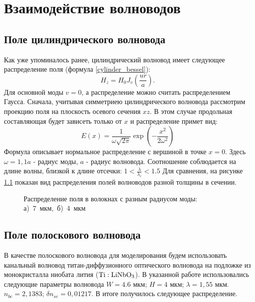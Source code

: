 \chapter{Взаимодействие волноводов}
\label{coupling}
\section{Поле цилиндрического волновода}
Как уже упоминалось ранее, цилиндрический волновод имеет следующее распределение поля (формула \ref{cylinder_bessel}):
$$
	H_z = H_0 J_v (\frac{ur}{a}).
$$
Для основной моды $v = 0$, а распределение можно считать распределением Гаусса. Сначала, учитывая  симметриею цилиндрического волновода рассмотрим проекцию поля на плоскость осевого сечения $xz$. В этом случае продольная составляющая будет зависеть только от $x$ и распределение примет вид:
\begin{equation}
  \label{gauss}
  E(x)=\frac{1}{\omega\sqrt{2\pi}}\exp\left(-\frac{x^2}{2\omega^2}\right)
\end{equation}
Формула описывает нормальное распределение с вершиной в точке $x=0$.
Здесь $\omega = 1,1a$ - радиус моды, $a$ - радиус волновода. Соотношение соблюдается на длине волны, близкой к длине отсечки: $1 < \frac{\lambda}{\lambda_c} < 1.5$
Для сравнения, на рисунке \ref{diameter} показан вид распределения полей волноводов разной толщины в сечении.

\begin{figure}[h!]
	\begin{minipage}[h]{0.49\linewidth}
	\end{minipage}
	\hfill
	\begin{minipage}[h]{0.49\linewidth}
	\end{minipage}
	\caption{Распределение поля в волокнах с разным радиусом моды: \mbox{а) 7~мкм, б) 4~мкм}}
	\label{diameter}
\end{figure}

\section{Поле полоскового волновода}
\label{strip_field}
В качестве полоскового волновода для моделирования будем использовать канальный волновод титан-диффузионного оптического волновода на подложке из монокристалла ниобата лития ($\rm Ti:LiNbO_3$)\cite{vlada}. В указанной работе использовались следующие параметры волновода $W=4.6$ мкм; $H=4$ мкм; $\lambda = 1,55$ мкм. $n_{be}=2,1383$; $\delta n_{se}=0,01217$. В итоге получилось следующее распределение.

